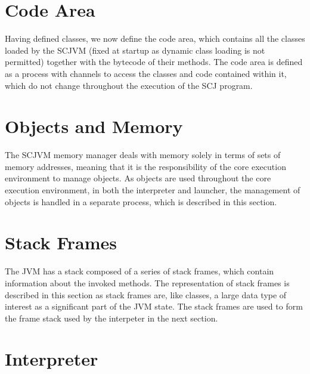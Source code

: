 \documentclass[a4paper,10pt]{report}
\begin{document}


\section{Code Area}
\label{cee-code-area-section}

Having defined classes, we now define the code area, which contains
all the classes loaded by the SCJVM (fixed at startup as dynamic class
loading is not permitted) together with the bytecode of their methods.
The code area is defined as a \Circus{} process with channels to
access the classes and code contained within it, which do not change
throughout the execution of the SCJ program.



\section{Objects and Memory}
\label{cee-memory-section}

The SCJVM memory manager deals with memory solely in terms of sets of
memory addresses, meaning that it is the responsibility of the core
execution environment to manage objects.
As objects are used throughout the core execution environment, in both
the interpreter and launcher, the management of objects is handled in
a separate \Circus{} process, which is described in this section.



\section{Stack Frames}
\label{cee-stack-frames-section}

The JVM has a stack composed of a series of stack frames, which
contain information about the invoked methods.
The representation of stack frames is described in this section as
stack frames are, like classes, a large data type of interest as a
significant part of the JVM state.
The stack frames are used to form the frame stack used by the
interpeter in the next section.



\section{Interpreter}
\label{cee-interpreter-section}
\end{document}
